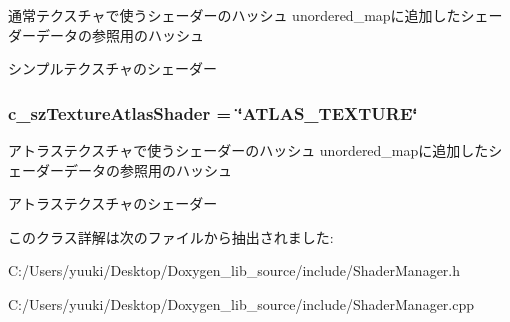 通常テクスチャで使うシェーダーのハッシュ  unordered\+\_\+mapに追加したシェーダーデータの参照用のハッシュ 

シンプルテクスチャのシェーダー 
\subsubsection[{\texorpdfstring{c\+\_\+sz\+Texture\+Atlas\+Shader}{c_szTextureAtlasShader}}]{\setlength{\rightskip}{0pt plus 5cm}c\+\_\+sz\+Texture\+Atlas\+Shader = \char`\"{}A\+T\+L\+A\+S\+\_\+\+T\+E\+X\+T\+U\+RE\char`\"{}\hspace{0.3cm}{\ttfamily [static]}}\hypertarget{class_d3_d11_1_1_graphic_1_1_shader_manager_af418a1f0ddd33cf8dd7765f88c05aa3b}{}\label{class_d3_d11_1_1_graphic_1_1_shader_manager_af418a1f0ddd33cf8dd7765f88c05aa3b}


アトラステクスチャで使うシェーダーのハッシュ  unordered\+\_\+mapに追加したシェーダーデータの参照用のハッシュ 

アトラステクスチャのシェーダー 

このクラス詳解は次のファイルから抽出されました\+:\begin{DoxyCompactItemize}
\item 
C\+:/\+Users/yuuki/\+Desktop/\+Doxygen\+\_\+lib\+\_\+source/include/Shader\+Manager.\+h\item 
C\+:/\+Users/yuuki/\+Desktop/\+Doxygen\+\_\+lib\+\_\+source/include/Shader\+Manager.\+cpp\end{DoxyCompactItemize}
